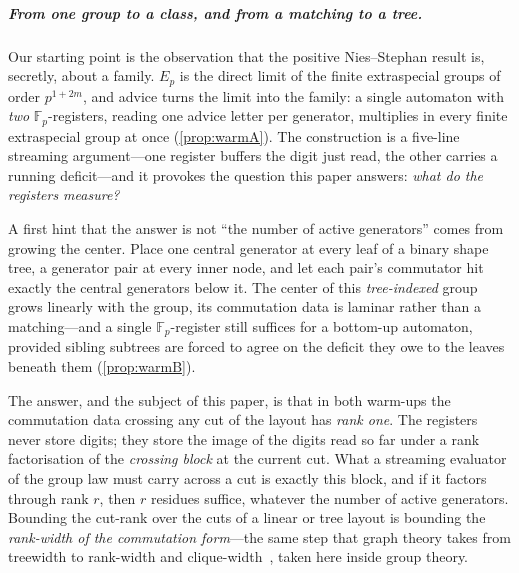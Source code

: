 \documentclass[a4paper,UKenglish,autoref,anonymous]{lipics-v2021}
\newcommand{\Fp}{\mathbb{F}_p}
\begin{document}
\subparagraph*{From one group to a class, and from a matching to a tree.}
Our starting point is the observation that the positive Nies--Stephan
result is, secretly, about a family. $E_p$ is the direct limit of the
finite extraspecial groups of order $p^{1+2m}$, and advice turns the limit
into the family: a single automaton with \emph{two} $\Fp$-registers, reading
one advice letter per generator, multiplies in every finite extraspecial
group at once (\autoref{prop:warmA}). The construction is a five-line
streaming argument---one register buffers the digit just read, the other
carries a running deficit---and it provokes the question this paper
answers: \emph{what do the registers measure?}

A first hint that the answer is not ``the number of active generators''
comes from growing the center. Place one central generator at every leaf
of a binary shape tree, a generator pair at every inner node, and let each
pair's commutator hit exactly the central generators below it. The center
of this \emph{tree-indexed} group grows linearly with the group, its
commutation data is laminar rather than a matching---and a single
$\Fp$-register still suffices for a bottom-up automaton, provided sibling
subtrees are forced to agree on the deficit they owe to the leaves beneath
them (\autoref{prop:warmB}).

The answer, and the subject of this paper, is that in both warm-ups the
commutation data crossing any cut of the layout has \emph{rank one}. The
registers never store digits; they store the image of the digits read so
far under a rank factorisation of the \emph{crossing block} at the current
cut. What a streaming evaluator of the group law must carry across a cut
is exactly this block, and if it factors through rank $r$, then $r$
residues suffice, whatever the number of active generators. Bounding the
cut-rank over the cuts of a linear or tree layout is bounding the
\emph{rank-width of the commutation form}---the same step that graph
theory takes from treewidth to rank-width and
clique-width~\cite{OumSeymour2006,CourcelleOum2007}, taken here inside
group theory.
\end{document}
